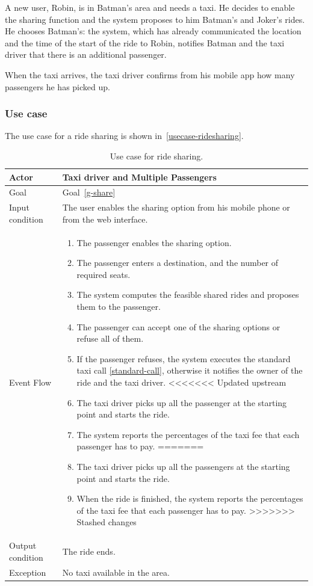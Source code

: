 A new user, Robin, is in Batman's area and needs a taxi. He decides to enable the sharing function and the system proposes to him Batman's and Joker's rides.
He chooses Batman's: the system, which has already communicated the location and the time of the start of the ride to Robin, notifies Batman and the taxi driver that there is an additional passenger.

When the taxi arrives, the taxi driver confirms from his mobile app how many passengers he has picked up.

\subsubsection{Use case}
The use case for a ride sharing is shown in~\autoref{usecase-ridesharing}.

\begin{table}
\begin{center}
\begin{tabular}{| l | p{} |}
\hline
Actor & Taxi driver and Multiple Passengers \\
\hline
Goal & Goal~\ref{g-share}
\\
\hline
Input condition & The user enables the sharing option from his mobile phone or from the web interface.  \\
\hline
Event Flow &
\begin{enumerate}
	\item The passenger enables the sharing option.
	\item The passenger enters a destination, and the number of required seats.
	\item The system computes the feasible shared rides and proposes them to the passenger.
	\item The passenger can accept one of the sharing options or refuse all of them.
	\item If the passenger refuses, the system executes the standard taxi call \ref{standard-call}, otherwise it notifies the owner of the ride and the taxi driver.
<<<<<<< Updated upstream
	\item The taxi driver picks up all the passenger at the starting point and starts the ride.
	\item The system reports the percentages of the taxi fee that each passenger has to pay.
=======
	\item The taxi driver picks up all the passengers at the starting point and starts the ride.
	\item When the ride is finished, the system reports the percentages of the taxi fee that each passenger has to pay.
>>>>>>> Stashed changes
\end{enumerate}
\\
\hline
Output condition & The ride ends. \\
\hline
Exception & No taxi available in the area. \\
\hline
\end{tabular}
\end{center}
\caption{Use case for ride sharing.}
\label{usecase-ridesharing}
\end{table}

